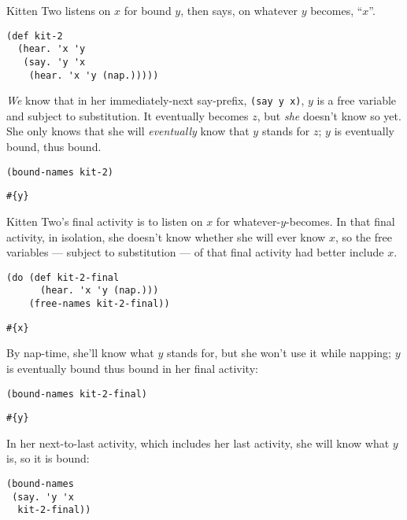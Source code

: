 \documentclass[10pt,oneside,x11names]{article}
\theoremstyle{definition}
\theoremstyle{warning}
\begin{document}
Kitten Two listens on \(x\) for bound \(y\), then says, on whatever
\(y\) becomes, ``\(x\)''.

\vskip 0.26cm
\begin{verbatim}
(def kit-2
  (hear. 'x 'y
   (say. 'y 'x
    (hear. 'x 'y (nap.)))))
\end{verbatim}

\emph{We} know that in her immediately-next say-prefix,
\texttt{(say y x)}, \(y\) is a free variable and subject to
substitution. It eventually becomes \(z\), but \emph{she} doesn't
know so yet. She only knows that she will \emph{eventually} know
that \(y\) stands for \(z\); \(y\) is eventually bound, thus bound.

\vskip 0.26cm
\begin{verbatim}
(bound-names kit-2)
\end{verbatim}

\begin{verbatim}
#{y}
\end{verbatim}


Kitten Two's final activity is to listen on \(x\) for
whatever-\(y\)-becomes. In that final activity, in isolation,
she doesn't know whether she will ever know \(x\), so the free
variables --- subject to substitution --- of that final
activity had better include \(x\).

\vskip 0.26cm
\begin{verbatim}
(do (def kit-2-final
      (hear. 'x 'y (nap.)))
    (free-names kit-2-final))
\end{verbatim}

\begin{verbatim}
#{x}
\end{verbatim}


By nap-time, she'll know what \(y\) stands for, but she won't
use it while napping; \(y\) is eventually bound thus bound in
her final activity:

\vskip 0.26cm
\begin{verbatim}
(bound-names kit-2-final)
\end{verbatim}

\begin{verbatim}
#{y}
\end{verbatim}


\newpage
In her next-to-last activity, which includes her last activity,
she will know what \(y\) is, so it is bound:

\vskip 0.26cm
\begin{verbatim}
(bound-names
 (say. 'y 'x
  kit-2-final))
\end{verbatim}
\end{document}
